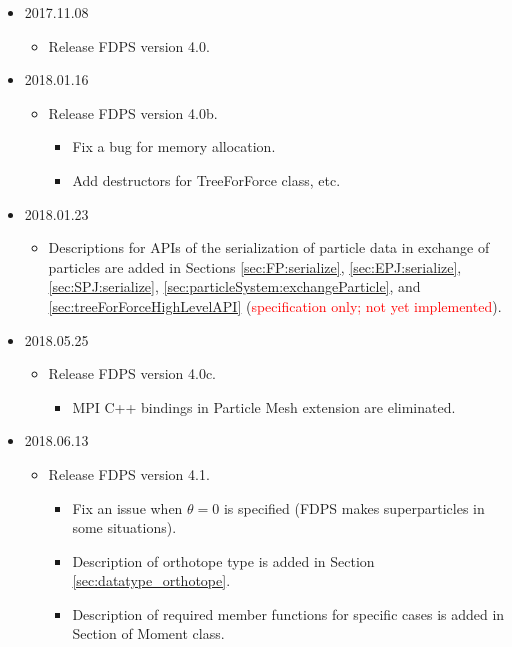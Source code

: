 \begin{itemize}
    \item 2017.11.08
  \begin{itemize}
  \item Release FDPS version 4.0.
  \end{itemize}

  \item 2018.01.16
    \begin{itemize}
    \item Release FDPS version 4.0b.
      \begin{itemize}
      \item Fix a bug for memory allocation.
      \item Add destructors for TreeForForce class, etc.
      \end{itemize}
    \end{itemize}

  \item 2018.01.23
    \begin{itemize}
    \item Descriptions for APIs of the serialization of particle data in exchange of particles are added in Sections \ref{sec:FP:serialize}, \ref{sec:EPJ:serialize}, \ref{sec:SPJ:serialize},          \ref{sec:particleSystem:exchangeParticle}, and \ref{sec:treeForForceHighLevelAPI} (\textcolor{red}{specification only; not yet implemented}).
    \end{itemize}

  \item 2018.05.25
    \begin{itemize}
    \item Release FDPS version 4.0c.
      \begin{itemize}
      \item MPI C++ bindings in Particle Mesh extension are eliminated.
      \end{itemize}
    \end{itemize}

  \item 2018.06.13
    \begin{itemize}
    \item Release FDPS version 4.1.
      \begin{itemize}
      \item Fix an issue when $\theta=0$ is specified (FDPS makes superparticles in some situations).
      \item Description of orthotope type is added in Section \ref{sec:datatype_orthotope}.
      \item Description of required member functions for specific cases is added in Section of Moment class.
      \end{itemize}
    \end{itemize}


\end{itemize}
